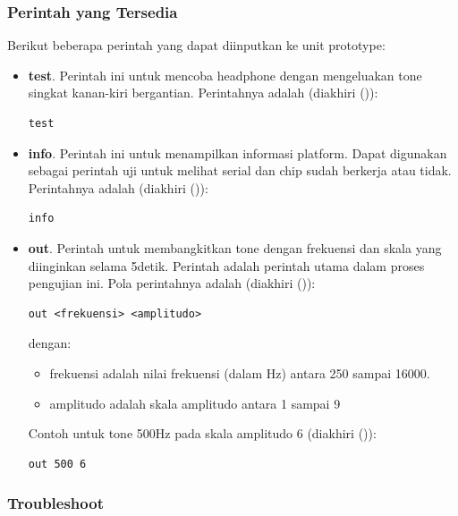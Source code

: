 \documentclass[12pt,]{article}
\begin{document}
	\subsubsection{Perintah yang Tersedia}
	
	Berikut beberapa perintah yang dapat diinputkan ke unit prototype:
	
	\begin{itemize}
		\item \textbf{test}.
		Perintah ini untuk mencoba headphone dengan mengeluakan tone singkat kanan-kiri bergantian.
		Perintahnya adalah (diakhiri (\keys{\return})):
		\begin{verbatim}
test
		\end{verbatim}
		
		\item \textbf{info}.
		Perintah ini untuk menampilkan informasi platform.
		Dapat digunakan sebagai perintah uji untuk melihat serial dan chip sudah berkerja atau tidak.
		Perintahnya adalah (diakhiri (\keys{\return})):
		\begin{verbatim}
info
		\end{verbatim}
		
		\item \textbf{out}.
		Perintah untuk membangkitkan tone dengan frekuensi dan skala yang diinginkan selama 5detik.
		Perintah adalah perintah utama dalam proses pengujian ini.
		Pola perintahnya adalah (diakhiri (\keys{\return})):
		\begin{verbatim}
out <frekuensi> <amplitudo>
		\end{verbatim}
		dengan:
		\begin{itemize}
			\item frekuensi adalah nilai frekuensi (dalam Hz) antara 250 sampai 16000.
			\item amplitudo adalah skala amplitudo antara 1 sampai 9
		\end{itemize}
		Contoh untuk tone 500Hz pada skala amplitudo 6 (diakhiri (\keys{\return})):
		\begin{verbatim}
out 500 6
		\end{verbatim}
	\end{itemize}
	
	\newpage
	\subsubsection{Troubleshoot}
	
\end{document}
